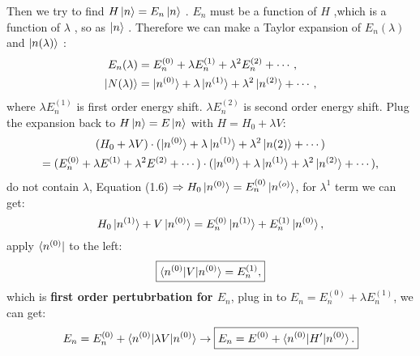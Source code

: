 \documentclass[UTF8,12pt]{article} %
\begin{document}
Then we try to find $H\ket{n}=E_n\ket{n}$ . $E_n$ must be a function of $H$ ,which is a function of $\lambda$ , so as $\ket{n}$ . Therefore we can make a Taylor expansion of $E_n(\lambda)$ and $\ket{n(\lambda)}$ :
\begin{equation}
    \begin{aligned}
        E_n(\lambda)&=E_n^{(0)}+\lambda E^{(1)}_n+\lambda^2 E^{(2)}_n+\cdots , 
        \\ 
        \ket{N(\lambda)}&=\ket{n^{(0)}}+\lambda \ket{n^{(1)}}+\lambda^2 \ket{n^{(2)}}+\cdots , 
    \end{aligned}
\end{equation}
where $\lambda E^{(1)}_n$ is first order energy shift. $\lambda E^{(2)}_n$ is second order energy shift. Plug the expansion back to $H\ket{n}=E\ket{n}$ with $H=H_0+\lambda V$:
\begin{multline}
    (H_0+\lambda V)\cdot (\ket{n^{(0)}}+\lambda \ket{n^{(1)}}+\lambda^2\ket{n{(2)}}+\cdots)\\=(E^{(0)}_n+\lambda E^{(1)}+\lambda^2E^{(2)}+\cdots)\cdot (\ket{n^{(0)}}+\lambda \ket{n^{(1)}}+\lambda^2\ket{n^{(2)}}+\cdots) , 
\end{multline}
do not contain $\lambda$, Equation (1.6) $\Rightarrow H_0\ket{n^{(0)}}=E^{(0)}_n\ket{n^{(o)}}$, for $\lambda^1$ term we can get:
\begin{equation}
    H_0\ket{n^{(1)}}+V\ket{n^{(0)}}=E^{(0)}_n\ket{n^{(1)}}+E^{(1)}_n\ket{n^{(0)}} , 
\end{equation}
apply $\bra{n^{(0)}}$ to the left:
\begin{equation}
    \boxed{ \braket{n^{(0)}|V|n^{(0)}}=E^{(1)}_n , }  
\end{equation}
which is {\bf first order pertubrbation for $E_n$}, plug in to $E_n=E^{(0)}_n+\lambda E^{(1)}_n $, we can get:
\begin{equation}
    \begin{aligned}
        E_n= E^{(0)}_n+ \braket{n^{(0)}|\lambda V|n^{(0)}} \to \boxed {E_n=E^{(0)}+\braket{n^{(0)}|H'|n^{(0)}} . }
    \end{aligned}    
\end{equation}
\end{document}
